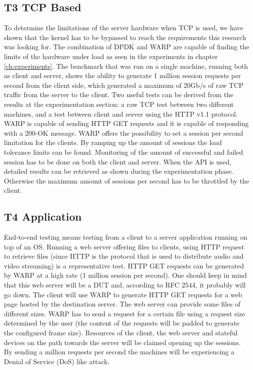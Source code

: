 \subsection{T3 TCP Based}
To determine the limitations of the server hardware when TCP is used, we have shown that the kernel has to be bypassed to reach the requirements this research was looking for. 
The combination of DPDK and WARP are capable of finding the limits of the hardware under load as seen in the experiments in chapter \ref{ch:experiments}. The benchmark that was run on a single machine, running both as client and server, shows the ability to generate 1 million session requests per second from the client side, which generated a maximum of 20Gb/s of raw TCP traffic from the server to the client. 
Two useful tests can be derived from the results at the experimentation section: a raw TCP test between two different machines, and a test between client and server using the HTTP v1.1 protocol. 
WARP is capable of sending  HTTP GET requests and it is capable of responding with a 200-OK message.
WARP offers the possibility to set a session per second limitation for the clients. By ramping up the amount of sessions the load tolerance limits can be found. 
Monitoring of the amount of successful and failed session has to be done on both the client and server. When the API is used, detailed results can be retrieved as shown during the experimentation phase. Otherwise the maximum amount of sessions per second has to be throttled by the client.    

\subsection{T4 Application}
End-to-end testing means testing from a client to a server application running on top of an OS.
Running a web server offering files to clients, using HTTP request to retrieve files (since HTTP is the protocol that is used to distribute audio and video streaming) is a representative test.
HTTP GET requests can be generated by WARP at a high rate (1 million session per second). 
One should keep in mind that this web server will be a DUT and, according to RFC 2544, it probably will go down.   
The client will use WARP to generate HTTP GET requests for a web page hosted by the destination server. The web server can provide some files of different sizes. WARP has to send a request for a certain file using a request size determined by the user (the content of the requests will be padded to generate the configured frame size).  Resources of the client, the web server and stateful devices on the path towards the server will be claimed opening up the sessions. By sending a million requests per second the machines will be experiencing a Denial of Service (DoS) like attack.

